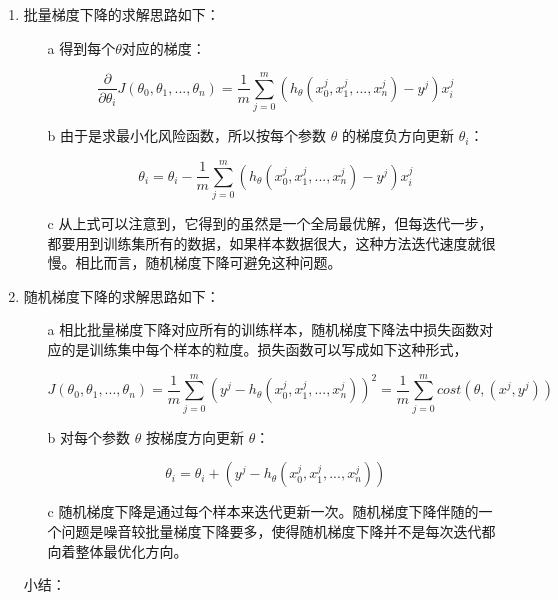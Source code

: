 \begin{enumerate}
	\itemsep0em

	\item 批量梯度下降的求解思路如下：

		\begin{enumerate}
			\itemsep0em
			\item[a] 得到每个$ \theta $对应的梯度：

				$$
				\frac{\partial}{\partial \theta_i}J({\theta}_0,{\theta}_1,...,{\theta}_n)=\frac{1}{m}\sum^{m}_{j=0}(h_\theta (x^{j}_0 ,x^{j}_1,...,x^{j}_n)-y^j)x^{j}_i
				$$

			\item[b] 由于是求最小化风险函数，所以按每个参数 $ \theta $ 的梯度负方向更新 $ \theta_i $：

				$$
				\theta_i=\theta_i - \frac{1}{m} \sum^{m}_{j=0}(h_\theta (x^{j}_0,x^{j}_1,...,x^{j}_n)-y^j)x^{j}_i
				$$

			\item[c] 从上式可以注意到，它得到的虽然是一个全局最优解，但每迭代一步，都要用到训练集所有的数据，如果样本数据很大，这种方法迭代速度就很慢。相比而言，随机梯度下降可避免这种问题。
		\end{enumerate}

	\item 随机梯度下降的求解思路如下：

		\begin{enumerate}
			\itemsep0em

			\item[a] 相比批量梯度下降对应所有的训练样本，随机梯度下降法中损失函数对应的是训练集中每个样本的粒度。损失函数可以写成如下这种形式，

				$$
				J(\theta_0, \theta_1, ... , \theta_n) =
				\frac{1}{m} \sum^{m}_{j=0}(y^j - h_\theta (x^{j}_0
				,x^{j}_1,...,x^{j}_n))^2 =
				\frac{1}{m} \sum^{m}_{j=0} cost(\theta,(x^j,y^j))
				$$

			\item[b] 对每个参数 $ \theta$ 按梯度方向更新 $ \theta$：

				$$
				\theta_i = \theta_i + (y^j - h_\theta (x^{j}_0, x^{j}_1, ... ,x^{j}_n))
				$$

			\item[c] 随机梯度下降是通过每个样本来迭代更新一次。随机梯度下降伴随的一个问题是噪音较批量梯度下降要多，使得随机梯度下降并不是每次迭代都向着整体最优化方向。

		\end{enumerate}

		小结：


\end{enumerate}
